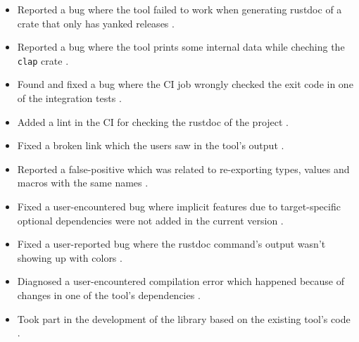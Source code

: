 \documentclass[licencjacka,en]{pracamgr}
\begin{document}
\begin{itemize}
\begin{itemize}
			\item Reported a bug where the tool failed to work when
				generating rustdoc of a crate that only has yanked releases \cite{issue_fails_yanked}.
			\item Reported a bug where the tool prints some internal data
				while cheching the \texttt{clap} crate \cite{issue_internal_data}.
			\item Found and fixed a bug where the CI job wrongly checked
				the exit code in one of the integration tests \cite{pr_exit_code}.
			\item Added a lint in the CI for checking the rustdoc of the project \cite{pr_ci_rustdoc}.
			\item Fixed a broken link which the users saw in the tool's output \cite{pr_broken_link}.
			\item Reported a false-positive which was related to re-exporting types, values and macros
				with the same names \cite{issue_reexporting}.
			\item Fixed a user-encountered bug where implicit features due to target-specific
				optional dependencies were not added in the current version \cite{pr_false_positive_target_specific}.
			\item Fixed a user-reported bug \cite{issue_color_always}
				where the rustdoc command's output wasn't showing up with colors \cite{pr_color_always}.
			\item Diagnosed a user-encountered compilation error which happened
				because of changes in one of the tool's dependencies \cite{issue_compiling_fails}.
			\item Took part in the development of the library based on the existing tool's code \cite{pr_library}.
		\end{itemize}


\end{itemize}
\end{document}
